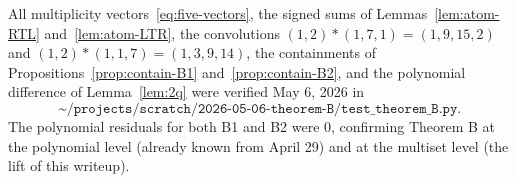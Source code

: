 \documentclass[11pt]{article}
\theoremstyle{definition}
\begin{document}
All multiplicity vectors~\eqref{eq:five-vectors}, the signed sums of Lemmas~\ref{lem:atom-RTL} and~\ref{lem:atom-LTR}, the convolutions $(1,2) \ast (1,7,1) = (1,9,15,2)$ and $(1,2) \ast (1,1,7) = (1,3,9,14)$, the containments of Propositions~\ref{prop:contain-B1} and~\ref{prop:contain-B2}, and the polynomial difference of Lemma~\ref{lem:2q} were verified May 6, 2026 in
\[
\texttt{\textasciitilde/projects/scratch/2026-05-06-theorem-B/test\_theorem\_B.py}.
\]
The polynomial residuals for both B1 and B2 were $0$, confirming Theorem B at the polynomial level (already known from April 29) and at the multiset level (the lift of this writeup).
\end{document}
